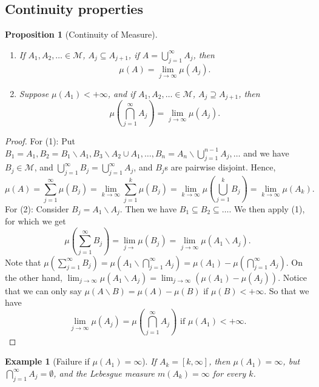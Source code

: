 \documentclass{tufte-handout}
\newtheorem{proposition}{Proposition}[section]
\newtheorem{example}{Example}[section]
\begin{document}
\subsection{Continuity properties}
\begin{proposition}[Continuity of Measure]
    \mbox{}
    \begin{enumerate}
        \item If $A_1, A_2, \dots \in \mathcal{M}$, $A_j \subseteq A_{j+1}$, if $A = \bigcup^{\infty}_{j=1} A_j$, then 
        \[
        \mu(A) = \lim_{j\rightarrow \infty} \mu(A_j).
        \]
        \item  Suppose $\mu(A_1) < +\infty$, and if $A_1, A_2, \dots \in \mathcal{M}$, $A_j \supseteq A_{j+1}$, then 
        \[
        \mu(\bigcap^{\infty}_{j=1} A_j) = \lim_{j\rightarrow \infty} \mu(A_j).
        \]
    \end{enumerate}
\end{proposition}
\begin{proof}
    For (1): Put $B_1=A_1, B_2=B_1\backslash A_1, B_3\backslash A_2\cup A_1, \dots, B_n=A_n\backslash \bigcup^{n-1}_{j=1}A_j,\dots$ and we have $B_j\in \mathcal{M}$, and $\bigcup^{\infty}_{j=1} B_j = \bigcup^{\infty}_{j=1} A_j$, and $B_j$s are pairwise disjoint. Hence,
    \[
    \mu(A) = \sum^{\infty}_{j=1} \mu(B_j) = \lim_{k\rightarrow \infty} \sum_{j=1}^{k}\mu(B_j) = \lim_{k\rightarrow \infty} \mu\left( \bigcup^{k}_{j=1} B_j\right) = \lim_{k\rightarrow \infty} \mu(A_k).
    \]
    For (2): Consider $B_j = A_1\backslash A_j$. Then we have $B_1 \subseteq B_2 \subseteq \dots$. We then apply (1), for which we get
    \[
    \mu\left( \sum_{j=1}^\infty B_j \right) = \lim_{j\rightarrow }\mu(B_j) = \lim_{j\rightarrow \infty} \mu(A_1\backslash A_j).
    \]
    Note that $\mu\left( \sum_{j=1}^\infty B_j \right) =\mu(A_1 \backslash \bigcap_{j=1}^\infty A_j) = \mu(A_1) - \mu(\bigcap_{j=1}^\infty A_j)$. On the other hand, $ \lim_{j\rightarrow \infty} \mu(A_1\backslash A_j)=\lim_{j\rightarrow \infty}(\mu(A_1) - \mu(A_j))$. Notice that we can only say 
    $\mu(A\backslash B) = \mu(A) - \mu(B)$ if $\mu(B)<+\infty$. So that we have
    \[
    \lim_{j\rightarrow \infty} \mu(A_j) = \mu\left(\bigcap^\infty_{j=1} A_j\right) \text{ if } \mu(A_1) < +\infty.
    \]
\end{proof}
\begin{example}[Failure if $\mu(A_1) = \infty$]
    If $A_k=[k,\infty]$, then $\mu(A_1)=\infty$, but $\bigcap^\infty_{j=1} A_j = \emptyset$, and the Lebesgue measure $m(A_k) = \infty$ for every $k$.
\end{example}
\end{document}
